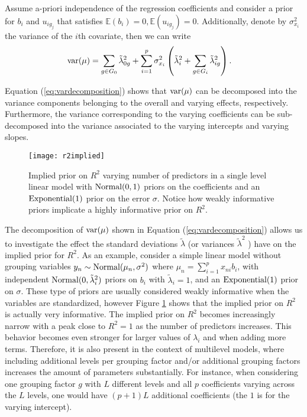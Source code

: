  Assume a-priori independence of the regression coefficients and consider a prior for $b_i$ and $u_{ig_j}$ that satisfies  $\mathbb{E}(b_i)=0, \mathbb{E}(u_{ig_{j}})=0$. Additionally, denote by $\sigma^2_{x_i}$ the variance of the $i$th covariate, then we can write
\begin{align}
\label{eq:vardecomposition}
	\text{var}(\mu)&= \sum_{g\in G_0} \tilde{\lambda}_{0g}^2   + \sum_{i=1}^p \sigma_{x_i}^2 \left(   \tilde{\lambda}^2_i+  \sum_{g\in G_i} \tilde{\lambda}_{ig}^2  \right) .
\end{align}

Equation (\ref{eq:vardecomposition}) shows that $\text{var}(\mu)$ can be decomposed into the variance components belonging to the overall and varying effects, respectively. Furthermore, the variance corresponding to the varying coefficients can be sub-decomposed into the variance associated to the varying intercepts and varying slopes.
 \begin{figure}[t!]%
    \centering
    \texttt{[image: r2implied]}
    \caption{Implied prior on $R^2$ varying number of predictors in a single level linear model with $\text{Normal}(0,1)$ priors on the coefficients and an $\text{Exponential}(1)$ prior on the error $\sigma$. Notice how weakly informative priors implicate a highly informative prior on $R^2$.}
    \label{fig:r2}
\end{figure}

The decomposition of $\text{var}(\mu)$ shown in Equation (\ref{eq:vardecomposition}) allows us to investigate the effect the standard deviations $\tilde{\lambda}$ (or variances $\tilde{\lambda}^2$ ) have on the implied prior for $R^2$. As an example, consider a simple linear model without grouping variables $y_n \sim \text{Normal}(\mu_n, \sigma^2)$ where $\mu_n= \sum_{i=1}^p x_{ni} b_i$, with independent $\text{Normal}(0,\tilde{\lambda}_i^2)$ priors on $b_i$ with $\tilde{\lambda}_i=1$, and an $\text{Exponential}(1)$ prior on $\sigma$. These type of priors are usually considered weakly informative when the variables are standardized, however Figure \ref{fig:r2} shows that the implied prior on $R^2$ is actually very informative. The implied prior on $R^2$ becomes increasingly narrow with a peak close to $R^2=1$ as the number of predictors increases. This behavior becomes even stronger for larger values of $\lambda_i$ and when adding more terms. Therefore, it is also present in the context of multilevel models, where including additional levels per grouping factor and/or additional grouping factors increases the amount of parameters substantially. For instance, when considering one grouping factor $g$ with $L$ different levels and all $p$ coefficients varying across the $L$ levels, one would have $(p+1)L$ additional coefficients (the $1$ is for the varying intercept).

